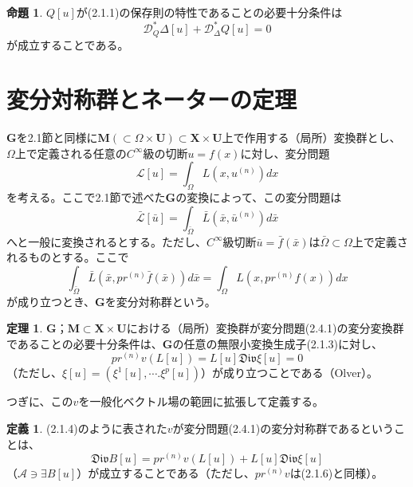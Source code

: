 \documentclass[a4paper, 11pt]{report}
\theoremstyle{definition}
\newtheorem{theorem}{定理}[section]
\newtheorem{definition}{定義}[section]
\newtheorem{proposition}{命題}[section]
\begin{document}
\begin{proposition}
 $Q[u]$が(2.1.1)の保存則の特性であることの必要十分条件は
\begin{equation}
\mathcal{D}_{Q}^*\varDelta[u] + \mathcal{D}_{\varDelta}^*Q[u] = 0 %
\end{equation}
が成立することである。
\end{proposition}

\section{変分対称群とネーターの定理}

 $\mathbf{G}$を2.1節と同様に$\mathbf{M}(\subset \Omega\times \mathbf{U})\subset \mathbf{X}\times \mathbf{U}$上で作用する（局所）変換群とし、$\Omega$上で定義される任意の$C^\infty$級の切断$u=f(x)$に対し、変分問題
\begin{equation}
\mathcal{L}[u] = \int _\Omega L(x,u^{(n)})dx %
\end{equation}
を考える。ここで2.1節で述べた$\mathbf{G}$の変換によって、この変分問題は
\begin{equation*}
\mathcal{\bar{L}}[\bar{u}] = \int _{\bar{\Omega}} \bar{L}(\bar{x},\bar{u}^{(n)})d\bar{x}
\end{equation*}
へと一般に変換されるとする。ただし、$C^\infty$級切断$\bar{u}=\bar{f}(\bar{x})$は$\bar{\Omega}\subset \Omega$上で定義されるものとする。ここで
\begin{equation*}
\int _{\bar{\Omega}} \bar{L}(\bar{x},pr^{(n)}\bar{f}(\bar{x}))d\bar{x} = \int _\Omega L(x,pr^{(n)}f(x))dx
\end{equation*}
が成り立つとき、$\mathbf{G}$を変分対称群という。

\begin{theorem}
 $\mathbf{G}$；$\mathbf{M}\subset\mathbf{X}\times\mathbf{U}$における（局所）変換群が変分問題(2.4.1)の変分変換群であることの必要十分条件は、$\mathbf{G}$の任意の無限小変換生成子(2.1.3)に対し、
\begin{equation}
pr^{(n)}v(L[u]) = L[u]\mathfrak{Div}\xi[u] = 0 %
\end{equation}
（ただし、$\xi[u] = (\xi^1[u],\cdots.\xi^p[u])$）が成り立つことである（Olver\cite[Chap.4]{Olver4}）。
\end{theorem}

 つぎに、この$v$を一般化ベクトル場の範囲に拡張して定義する。

\begin{definition}
 (2.1.4)のように表された$v$が変分問題(2.4.1)の変分対称群であるということは、
\begin{equation}
\mathfrak{Div}B[u] = pr^{(n)}v(L[u]) + L[u]\mathfrak{Div}\xi[u] %
\end{equation}
（$\mathcal{A}\ni \exists B[u]$）が成立することである（ただし、$pr^{(n)}v$は(2.1.6)と同様）。
\end{definition}
\end{document}
